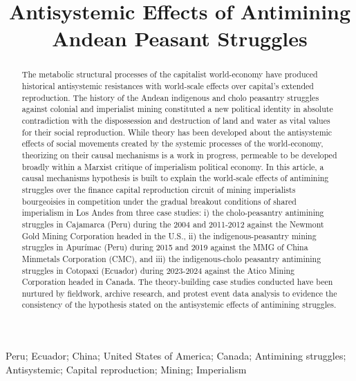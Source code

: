 \documentclass[]{interact}
\theoremstyle{plain}%
\theoremstyle{definition}
\theoremstyle{remark}
\begin{document}

\title{Antisystemic Effects of Antimining Andean Peasant Struggles}

\author{
}

\maketitle

\begin{abstract}
The metabolic structural processes of the capitalist world-economy have produced historical antisystemic resistances with world-scale effects over capital's extended reproduction. The history of the Andean indigenous and cholo peasantry struggles against colonial and imperialist mining constituted a new political identity in absolute contradiction with the dispossession and destruction of land and water as vital values for their social reproduction. While theory has been developed about the antisystemic effects of social movements created by the systemic processes of the world-economy, theorizing on their causal mechanisms is a work in progress, permeable to be developed broadly within a Marxist critique of imperialism political economy. In this article, a causal mechanisms hypothesis is built to explain the world-scale effects of antimining struggles over the finance capital reproduction circuit of mining imperialists bourgeoisies in competition under the gradual breakout conditions of shared imperialism in Los Andes from three case studies: i) the cholo-peasantry antimining struggles in Cajamarca (Peru) during the 2004 and 2011-2012 against the Newmont Gold Mining Corporation headed in the U.S., ii) the indigenous-peasantry mining struggles in Apurímac (Peru) during 2015 and 2019 against the MMG of China Minmetals Corporation (CMC), and iii) the indigenous-cholo peasantry antimining struggles in Cotopaxi (Ecuador) during 2023-2024 against the Atico Mining Corporation headed in Canada. The theory-building case studies conducted have been nurtured by fieldwork, archive research, and protest event data analysis to evidence the consistency of the hypothesis stated on the antisystemic effects of antimining struggles.
\end{abstract}

\begin{keywords}
Peru; Ecuador; China; United States of America; Canada; Antimining struggles; Antisystemic; Capital reproduction; Mining; Imperialism 
\end{keywords}
\end{document}
